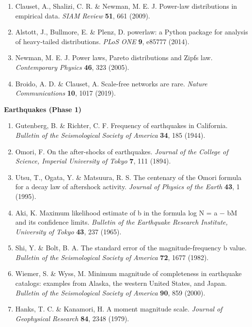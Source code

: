 \documentclass[
  11pt]{article}
\providecommand{\tightlist}{%
  \setlength{\itemsep}{0pt}\setlength{\parskip}{0pt}}
\begin{document}
\begin{enumerate}
\def\labelenumi{\arabic{enumi}.}
\setcounter{enumi}{9}
\tightlist
\item
  Clauset, A., Shalizi, C. R. \& Newman, M. E. J. Power-law
  distributions in empirical data. \emph{SIAM Review} \textbf{51}, 661
  (2009).
\item
  Alstott, J., Bullmore, E. \& Plenz, D. powerlaw: a Python package for
  analysis of heavy-tailed distributions. \emph{PLoS ONE} \textbf{9},
  e85777 (2014).
\item
  Newman, M. E. J. Power laws, Pareto distributions and
  Zipf\textquotesingle s law. \emph{Contemporary Physics} \textbf{46},
  323 (2005).
\item
  Broido, A. D. \& Clauset, A. Scale-free networks are rare.
  \emph{Nature Communications} \textbf{10}, 1017 (2019).
\end{enumerate}

\textbf{Earthquakes (Phase 1)}

\begin{enumerate}
\def\labelenumi{\arabic{enumi}.}
\setcounter{enumi}{13}
\tightlist
\item
  Gutenberg, B. \& Richter, C. F. Frequency of earthquakes in
  California. \emph{Bulletin of the Seismological Society of America}
  \textbf{34}, 185 (1944).
\item
  Omori, F. On the after-shocks of earthquakes. \emph{Journal of the
  College of Science, Imperial University of Tokyo} \textbf{7}, 111
  (1894).
\item
  Utsu, T., Ogata, Y. \& Matsu\textquotesingle ura, R. S. The centenary
  of the Omori formula for a decay law of aftershock activity.
  \emph{Journal of Physics of the Earth} \textbf{43}, 1 (1995).
\item
  Aki, K. Maximum likelihood estimate of b in the formula log N = a − bM
  and its confidence limits. \emph{Bulletin of the Earthquake Research
  Institute, University of Tokyo} \textbf{43}, 237 (1965).
\item
  Shi, Y. \& Bolt, B. A. The standard error of the magnitude-frequency b
  value. \emph{Bulletin of the Seismological Society of America}
  \textbf{72}, 1677 (1982).
\item
  Wiemer, S. \& Wyss, M. Minimum magnitude of completeness in earthquake
  catalogs: examples from Alaska, the western United States, and Japan.
  \emph{Bulletin of the Seismological Society of America} \textbf{90},
  859 (2000).
\item
  Hanks, T. C. \& Kanamori, H. A moment magnitude scale. \emph{Journal
  of Geophysical Research} \textbf{84}, 2348 (1979).
\end{enumerate}
\end{document}
